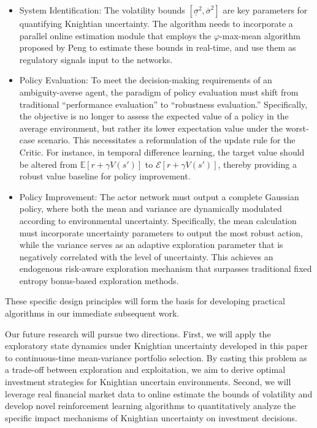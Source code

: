 \documentclass[onecolumn, journal]{IEEEtran} %
\begin{document}
	\begin{itemize}
		\item System Identification: The volatility bounds $[\underline{\sigma}^2, \overline{\sigma}^2]$ are key parameters for quantifying Knightian uncertainty. The algorithm needs to incorporate a parallel online estimation module that employs the $\varphi$-max-mean algorithm proposed by Peng \cite{peng2017} to estimate these bounds in real-time, and use them as regulatory signals input to the networks.
		
		\item Policy Evaluation: To meet the decision-making requirements of an ambiguity-averse agent, the paradigm of policy evaluation must shift from traditional ``performance evaluation'' to ``robustness evaluation.'' Specifically, the objective is no longer to assess the expected value of a policy in the average environment, but rather its lower expectation value under the worst-case scenario. This necessitates a reformulation of the update rule for the Critic. For instance, in temporal difference learning, the target value should be altered from $\mathbb{E}[r + \gamma V(s')]$ to $\mathcal{E}[r + \gamma V(s')]$, thereby providing a robust value baseline for policy improvement.
		
		\item Policy Improvement: The actor network must output a complete Gaussian policy, where both the mean and variance are dynamically modulated according to environmental uncertainty. Specifically, the mean calculation must incorporate uncertainty parameters to output the most robust action, while the variance serves as an adaptive exploration parameter that is negatively correlated with the level of uncertainty. This achieves an endogenous risk-aware exploration mechanism that surpasses traditional fixed entropy bonus-based exploration methods.
		
		
	\end{itemize}
	
	These specific design principles will form the basis for developing practical algorithms in our immediate subsequent work.
	
	Our future research will pursue two directions. First, we will apply the exploratory state dynamics under Knightian uncertainty developed in this paper to continuous-time mean-variance portfolio selection. By casting this problem as a trade-off between exploration and exploitation, we aim to derive optimal investment strategies for Knightian uncertain environments. Second, we will leverage real financial market data to online estimate the bounds of volatility and develop novel reinforcement learning algorithms to quantitatively analyze the specific impact mechanisms of Knightian uncertainty on investment decisions.
	
\end{document}
